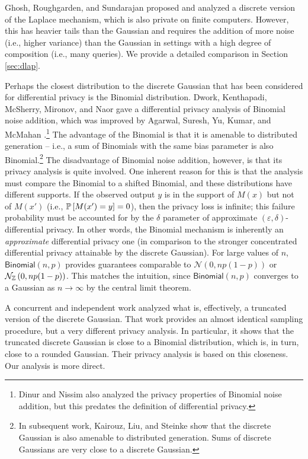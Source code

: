 \documentclass{jpcfinal} %
\newcommand{\dgausss}[2]{{\discN\left(#1,#2\right)}}
\newcommand{\dgauss}[1]{\dgausss{0}{#1}}
\newcommand{\pr}[2]{{\ifx&#1& \mathbb{P} \else
\underset{#1}{\mathbb{P}} \fi \left[#2\right]}}
\newcommand{\eps}{\varepsilon}
\begin{document}
Ghosh, Roughgarden, and Sundarajan \cite{GhoshRS12} proposed and analyzed a discrete version of the Laplace mechanism, which is also private on finite computers. However, this has heavier tails than the Gaussian and requires the addition of more noise (i.e., higher variance) than the Gaussian in settings with a high degree of composition (i.e., many queries). We provide a detailed comparison in Section \ref{sec:dlap}. 

Perhaps the closest distribution to the discrete Gaussian that has been considered for differential privacy is the Binomial distribution. Dwork, Kenthapadi, McSherry, Mironov, and Naor \cite{DworkKMMN06} gave a differential privacy analysis of Binomial noise addition, which was improved by Agarwal, Suresh, Yu, Kumar, and McMahan \cite{AgarwalSYKM18}.\footnote{Dinur and Nissim \cite{DinurN03} also analyzed the privacy properties of Binomial noise addition, but this predates the definition of differential privacy.} The advantage of the Binomial is that it is amenable to distributed generation -- i.e., a sum of Binomials with the same bias parameter is also Binomial.\footnote{In subsequent work, Kairouz, Liu, and Steinke \cite{KairouzLS21} show that the discrete Gaussian is also amenable to distributed generation. Sums of discrete Gaussians are very close to a discrete Gaussian.} The disadvantage of Binomial noise addition, however, is that its privacy analysis is quite involved. One inherent reason for this is that the analysis must compare the Binomial to a shifted Binomial, and these distributions have different supports. If the observed output $y$ is in the support of $M(x)$ but not of $M(x')$ (i.e., $\pr{}{M(x')=y}=0$), then the privacy loss is infinite; this failure probability must be accounted for by the $\delta$ parameter of approximate $(\eps,\delta)$-differential privacy. In other words, the Binomial mechanism is inherently an \emph{approximate} differential privacy one (in comparison to the stronger concentrated differential privacy attainable by the discrete Gaussian). For large values of $n$, $\mathsf{Binomial}(n,p)$ provides guarantees comparable to $\mathcal{N}(0,np(1-p))$ or $\dgauss{np(1-p)}$. This matches the intuition, since $\mathsf{Binomial}(n,p)$ converges to a Gaussian as $n \to \infty$ by the central limit theorem. 

A concurrent and independent work \citep{GoogleDGauss} analyzed what is, effectively, a truncated version of the discrete Gaussian. That work provides an almost identical sampling procedure, but a very different privacy analysis. In particular, it shows that the truncated discrete Gaussian is close to a Binomial distribution, which is, in turn, close to a rounded Gaussian. Their privacy analysis is based on this closeness. Our analysis is more direct.
\end{document}
